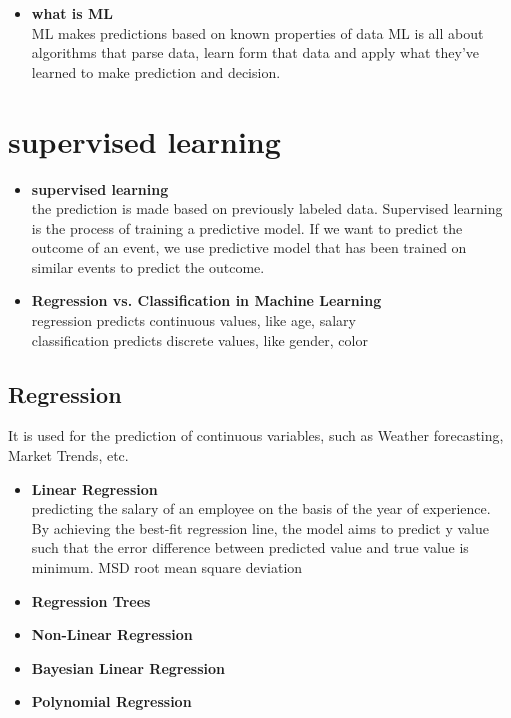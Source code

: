 \documentclass{article}
\begin{document}
\begin{itemize}
\item\textbf{what is ML}\\
ML makes predictions based on known properties of data
ML is all about algorithms that parse data, learn form that data and apply what they've learned to make prediction and decision.

\end{itemize}

\section{supervised learning}
\begin{itemize}

\item \textbf{supervised learning}\\
the prediction is made based on previously labeled data. Supervised learning is the process of training a predictive model. If we want to predict the outcome of an event, we use predictive model that has been trained on similar events to predict the outcome.
\item \textbf{Regression vs. Classification in Machine Learning}\\
regression predicts continuous values, like age, salary\\
classification predicts discrete values, like gender, color\\




\end{itemize}

\subsection*{Regression}
It is used for the prediction of continuous variables, such as Weather forecasting, Market Trends, etc.
\begin{itemize}
\item \textbf{Linear Regression}\\
predicting the salary of an employee on the basis of the year of experience. \\
By achieving the best-fit regression line, the model aims to predict y value such that the error difference between predicted value and true value is minimum. MSD root mean square deviation


\item \textbf{Regression Trees}\\

\item \textbf{Non-Linear Regression}\\

\item \textbf{Bayesian Linear Regression}\\

\item \textbf{Polynomial Regression}\\

\end{itemize}
\end{document}
